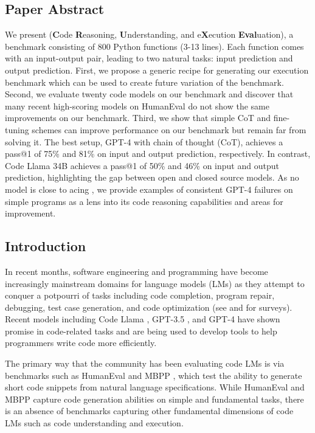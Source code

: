 \subsection*{Paper Abstract}
We present \benchmark (\textbf{C}ode \textbf{R}easoning, \textbf{U}nderstanding, and e\textbf{X}ecution \textbf{Eval}uation), a benchmark consisting of 800 Python functions (3-13 lines). Each function comes with an input-output pair, leading to two natural tasks: input prediction and output prediction. First, we propose a generic recipe for generating our execution benchmark which can be used to create future variation of the benchmark. Second, we evaluate twenty code models on our benchmark and discover that many recent high-scoring models on HumanEval do not show the same improvements on our benchmark. Third, we show that simple CoT and fine-tuning schemes can improve performance on our benchmark but remain far from solving it. The best setup, GPT-4 with chain of thought (CoT), achieves a pass@1 of 75\% and 81\% on input and output prediction, respectively. In contrast, Code Llama 34B achieves a pass@1 of 50\% and 46\% on input and output prediction, highlighting the gap between open and closed source models. As no model is close to acing \benchmark, we provide examples of consistent GPT-4 failures on simple programs as a lens into its code reasoning capabilities and areas for improvement. 


\subsection{Introduction} \label{sec:introduction}
In recent months, software engineering and programming have become increasingly mainstream domains for language models (LMs) as they attempt to conquer a potpourri of tasks including code completion, program repair, debugging, test case generation, and code optimization (see \citet{zan2023large} and \citet{fan2023large} for surveys). Recent models including Code Llama \citep{roziere2023code}, GPT-3.5 \citep{brown2020language, ouyang2022training}, and GPT-4 \citep{openai2023gpt} have shown promise in code-related tasks and are being used to develop tools to help programmers write code more efficiently.

The primary way that the community has been evaluating code LMs is via benchmarks such as HumanEval \citep{chen2021evaluating} and MBPP \citep{austin2021program}, which test the ability to generate short code snippets from natural language specifications. While HumanEval and MBPP capture code generation abilities on simple and fundamental tasks, there is an absence of benchmarks capturing other fundamental dimensions of code LMs such as code understanding and execution. 

